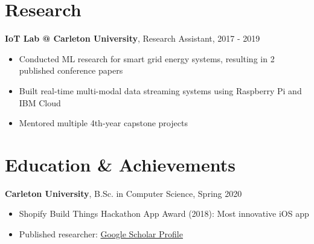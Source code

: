 \documentclass[9pt]{article}
\begin{document}
\section*{Research}
\textbf{IoT Lab @ Carleton University}, Research Assistant, 2017 - 2019
\begin{itemize}
    \setlength\itemsep{0em}
    \item Conducted ML research for smart grid energy systems, resulting in 2 published conference papers
    \item Built real-time multi-modal data streaming systems using Raspberry Pi and IBM Cloud
    \item Mentored multiple 4th-year capstone projects
\end{itemize}

\section*{Education \& Achievements}
\textbf{Carleton University}, B.Sc. in Computer Science, Spring 2020
\begin{itemize}
    \setlength\itemsep{0em}
    \item Shopify Build Things Hackathon App Award (2018): Most innovative iOS app
    \item Published researcher: \href{https://scholar.google.ca/citations?user=zFDREhgAAAAJ\&hl=en}{Google Scholar Profile}
\end{itemize}
\end{document}
